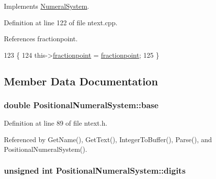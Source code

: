 Implements \hyperlink{classNumeralSystem_a5af49530e36feadbd24ef90206c5eceb}{Numeral\+System}.



Definition at line 122 of file ntext.\+cpp.



References fractionpoint.


\begin{DoxyCode}
123 \{
124     this->\hyperlink{classPositionalNumeralSystem_ad986e454b020c21e70f2efbc3682e44f}{fractionpoint} = \hyperlink{classPositionalNumeralSystem_ad986e454b020c21e70f2efbc3682e44f}{fractionpoint};
125 \}
\end{DoxyCode}


\subsection{Member Data Documentation}
\subsubsection[{\texorpdfstring{base}{base}}]{\setlength{\rightskip}{0pt plus 5cm}double Positional\+Numeral\+System\+::base\hspace{0.3cm}{\ttfamily [protected]}}\hypertarget{classPositionalNumeralSystem_a50cd19222978e16cc9c8b481c72c4662}{}\label{classPositionalNumeralSystem_a50cd19222978e16cc9c8b481c72c4662}


Definition at line 89 of file ntext.\+h.



Referenced by Get\+Name(), Get\+Text(), Integer\+To\+Buffer(), Parse(), and Positional\+Numeral\+System().

\subsubsection[{\texorpdfstring{digits}{digits}}]{\setlength{\rightskip}{0pt plus 5cm}unsigned int Positional\+Numeral\+System\+::digits\hspace{0.3cm}{\ttfamily [protected]}}\hypertarget{classPositionalNumeralSystem_a0a9e8e3f5d46e3c12dd3fc994ed2c1e6}{}\label{classPositionalNumeralSystem_a0a9e8e3f5d46e3c12dd3fc994ed2c1e6}


